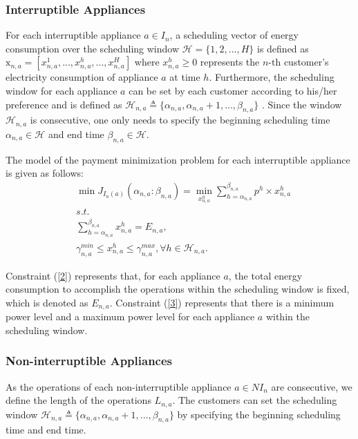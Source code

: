 \documentclass[10pt,journal]{IEEEtran}
\theoremstyle{definition}
\theoremstyle{plain} \newtheorem{theo}{Theorem} \newtheorem{prop}{Proposition}  \newtheorem{lemm}{Lemma}
\begin{document}
\subsubsection{Interruptible Appliances}



For each interruptible appliance $ a \in I_n $, a scheduling vector of energy consumption over the scheduling window $\mathcal{H}= \{1,2,...,H\}$  is defined as $\mathrm{x}_{n,a}=[x_{n,a}^1,...,x_{n,a}^h,...,x_{n,a}^H]$
where $ x^h_{n,a} \geq 0$ represents the $n$-th customer's electricity consumption of appliance $a$ at time $h$. Furthermore, the scheduling window for each appliance $a$ can be set by each customer according to his/her preference and is defined as $\mathcal{H}_{n,a} \triangleq \{\alpha_{n,a}, \alpha_{n,a}+1,...,\beta_{n,a}\}$ \cite{Leon-garcia2010}.  Since the window $\mathcal{H}_{n,a}$ is consecutive, one only needs to specify the beginning
scheduling time $\alpha_{n,a} \in \mathcal{H}$ and end time $\beta_{n,a} \in \mathcal{H}$.




The model of the payment minimization problem for each interruptible appliance is given as follows:
\begin{align}
  &\min J_{I_n(a)}(\alpha_{n,a} \colon \beta_{n,a}) = \min_{x_{n,a}^h} \sum_{h=\alpha_{n,a}}^{\beta_{n,a}} p^h \times x_{n,a}^h \label{1}\\
  &s.t. \nonumber\\
  &\sum_{h=\alpha_{n,a}}^{\beta_{n,a}} x_{n,a}^h=E_{n,a}, \label{2}\\
  &\gamma_{n,a}^{min}\leq x_{n,a}^h \leq \gamma_{n,a}^{max}, \forall h \in
\mathcal{H}_{n,a} \label{3}.
  \end{align}
  
Constraint (\ref{2}) represents that, for each appliance $a$, the total energy consumption to accomplish the operations within the scheduling window  is fixed, which is denoted as $E_{n,a}$. Constraint (\ref{3}) represents that there is a  minimum power level and a maximum power level for each appliance $a$ within the scheduling window. 








\subsubsection{Non-interruptible Appliances} 
As the operations of each non-interruptible appliance $a \in NI_n$ are consecutive, we define the length of the operations $L_{n,a}$. The customers can set the scheduling 
window $ \mathcal{H}_{n,a} \triangleq \{\alpha_{n,a}, \alpha_{n,a} + 1,...,\beta_{n,a}\}$ by specifying the beginning scheduling time and end time.
\end{document}
